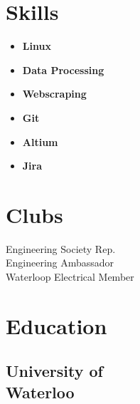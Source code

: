 \documentclass[]{chandan-cv}
\begin{document}
\begin{minipage}[t]{0.27\textwidth}
\section{Skills}
	\begin{itemize}
		\setlength\itemsep{-0.17em}
		\item \textbf{Linux}
		\item \textbf{Data Processing}
		\item \textbf{Webscraping}
		\item \textbf{Git}
		\item \textbf{Altium}
		\item \textbf{Jira}
	\end{itemize}
\sectionsep


\section{Clubs}
Engineering Society Rep.\\
Engineering Ambassador \\
Waterloop Electrical Member
\sectionsep



\section{Education}

\subsection{University of \\
Waterloo}
\sectionsep


%
%

\end{minipage}
\hfill
\end{document}

